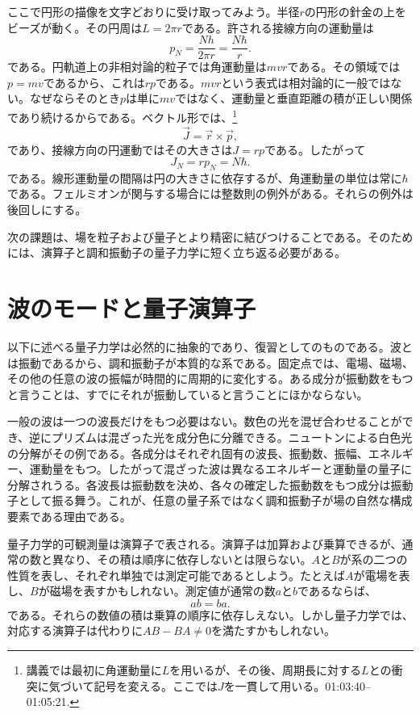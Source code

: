 ここで円形の描像を文字どおりに受け取ってみよう。半径\(r\)の円形の針金の上をビーズが動く。その円周は\(L=2\pi r\)である。許される接線方向の運動量は
\begin{equation}
p_N=\frac{Nh}{2\pi r}=\frac{N\hbar}{r}.
\end{equation}
である。円軌道上の非相対論的粒子では角運動量は\(mvr\)である。その領域では\(p=mv\)であるから、これは\(rp\)である。\(mvr\)という表式は相対論的に一般ではない。なぜならそのとき\(p\)は単に\(mv\)ではなく、運動量と垂直距離の積が正しい関係であり続けるからである。ベクトル形では、\footnote{講義では最初に角運動量に\(L\)を用いるが、その後、周期長に対する\(L\)との衝突に気づいて記号を変える。ここでは\(J\)を一貫して用いる。01:03:40--01:05:21.}
\begin{equation}
\vec J=\vec r\times\vec p,
\end{equation}
であり、接線方向の円運動ではその大きさは\(J=rp\)である。したがって
\begin{equation}
J_N=rp_N=N\hbar.
\end{equation}
である。線形運動量の間隔は円の大きさに依存するが、角運動量の単位は常に\(\hbar\)である。フェルミオンが関与する場合には整数則の例外がある。それらの例外は後回しにする。

次の課題は、場を粒子および量子とより精密に結びつけることである。そのためには、演算子と調和振動子の量子力学に短く立ち返る必要がある。

\section{波のモードと量子演算子}

以下に述べる量子力学は必然的に抽象的であり、復習としてのものである。波とは振動であるから、調和振動子が本質的な系である。固定点では、電場、磁場、その他の任意の波の振幅が時間的に周期的に変化する。ある成分が振動数をもつと言うことは、すでにそれが振動していると言うことにほかならない。

一般の波は一つの波長だけをもつ必要はない。数色の光を混ぜ合わせることができ、逆にプリズムは混ざった光を成分色に分離できる。ニュートンによる白色光の分解がその例である。各成分はそれぞれ固有の波長、振動数、振幅、エネルギー、運動量をもつ。したがって混ざった波は異なるエネルギーと運動量の量子に分解されうる。各波長は振動数を決め、各々の確定した振動数をもつ成分は振動子として振る舞う。これが、任意の量子系ではなく調和振動子が場の自然な構成要素である理由である。

量子力学的可観測量は演算子で表される。演算子は加算および乗算できるが、通常の数と異なり、その積は順序に依存しないとは限らない。\(A\)と\(B\)が系の二つの性質を表し、それぞれ単独では測定可能であるとしよう。たとえば\(A\)が電場を表し、\(B\)が磁場を表すかもしれない。測定値が通常の数\(a\)と\(b\)であるならば、
\begin{equation}
ab=ba.
\end{equation}
である。それらの数値の積は乗算の順序に依存しえない。しかし量子力学では、対応する演算子は代わりに\(AB-BA\neq0\)を満たすかもしれない。

